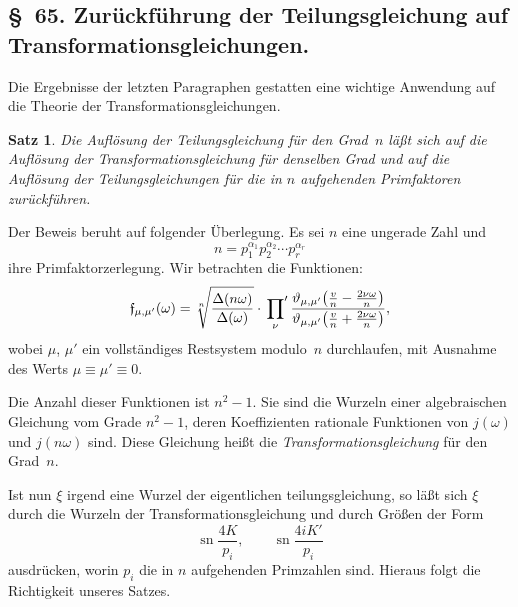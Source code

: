 \documentclass[11pt,a4paper]{article}
\theoremstyle{plain}
\newtheorem*{satz}{Satz}
\theoremstyle{remark}
\newcommand{\ff}{\mathfrak{f}}
\begin{document}
\subsection*{§~65. Zurückführung der Teilungsgleichung auf Transformationsgleichungen.}

Die Ergebnisse der letzten Paragraphen gestatten eine
wichtige Anwendung auf die Theorie der Transformationsgleichungen.

\begin{satz}
Die Auflösung der Teilungsgleichung für den Grad~$n$ läßt sich
auf die Auflösung der Transformationsgleichung für denselben
Grad und auf die Auflösung der Teilungsgleichungen für die
in $n$ aufgehenden Primfaktoren zurückführen.
\end{satz}

Der Beweis beruht auf folgender Überlegung. Es sei $n$ eine
ungerade Zahl und
\begin{equation}\label{eq:65:1}
n = p_1^{\alpha_1} p_2^{\alpha_2} \cdots p_r^{\alpha_r}
\end{equation}
 ihre Primfaktorzerlegung. Wir betrachten die Funktionen:
\begin{equation}\label{eq:65:2}
\ff_{\mu,\mu'}(\omega) = \sqrt[n]{\frac{\Delta(n\omega)}{\Delta(\omega)}}
\cdot\sideset{}{'}\prod_{\nu}
\frac{\vartheta_{\mu,\mu'}\bigl(\frac{v}{n}-\frac{2\nu\omega}{n}\bigr)}
     {\vartheta_{\mu,\mu'}\bigl(\frac{v}{n}+\frac{2\nu\omega}{n}\bigr)},
\end{equation}
wobei $\mu$, $\mu'$ ein vollständiges Restsystem modulo~$n$
durchlaufen, mit Ausnahme des Werts $\mu\equiv\mu'\equiv 0$.

Die Anzahl dieser Funktionen ist $n^2-1$. Sie sind die Wurzeln
einer algebraischen Gleichung vom Grade $n^2-1$, deren
Koeffizienten rationale Funktionen von $j(\omega)$ und
$j(n\omega)$ sind. Diese Gleichung heißt die
\emph{Transformationsgleichung} für den Grad~$n$.

Ist nun $\xi$ irgend eine Wurzel der eigentlichen
teilungsgleichung, so läßt sich $\xi$ durch die Wurzeln der
Transformationsgleichung und durch Größen der Form
\begin{equation}\label{eq:65:3}
\operatorname{sn}\frac{4K}{p_i},\qquad
\operatorname{sn}\frac{4iK'}{p_i}
\end{equation}
ausdrücken, worin $p_i$ die in $n$ aufgehenden Primzahlen sind.
Hieraus folgt die Richtigkeit unseres Satzes.
\end{document}
